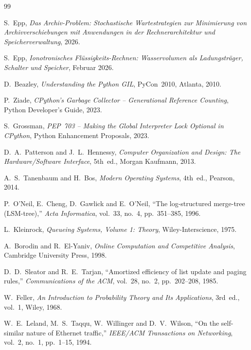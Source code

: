 ﻿\documentclass[a4paper,12pt]{scrreprt}
\theoremstyle{definition}
\begin{document}
	\begin{thebibliography}{99}
		
		
		S.~Epp,
		\textit{Das Archiv-Problem: Stochastische Wartestrategien zur Minimierung
			von Archivverschiebungen mit Anwendungen in der Rechnerarchitektur
			und Speicherverwaltung}, 2026.
		
		S.~Epp,
		\textit{Ionotronisches Flüssigkeits-Rechnen: Wasservolumen als
			Ladungsträger, Schalter und Speicher}, Februar 2026.
		
		D.~Beazley,
		\textit{Understanding the Python GIL},
		PyCon~2010, Atlanta, 2010.
		
		P.~Ziade,
		\textit{CPython's Garbage Collector -- Generational Reference Counting},
		Python Developer's Guide, 2023.
		
		S.~Grossman,
		\textit{PEP~703 -- Making the Global Interpreter Lock Optional in CPython},
		Python Enhancement Proposals, 2023.
		
		D.~A.~Patterson and J.~L.~Hennessy,
		\textit{Computer Organization and Design: The Hardware/Software Interface},
		5th~ed., Morgan Kaufmann, 2013.
		
		A.~S.~Tanenbaum and H.~Bos,
		\textit{Modern Operating Systems}, 4th~ed., Pearson, 2014.
		
		P.~O'Neil, E.~Cheng, D.~Gawlick and E.~O'Neil,
		``The log-structured merge-tree (LSM-tree),''
		\textit{Acta Informatica}, vol.~33, no.~4, pp.~351--385, 1996.
		
		L.~Kleinrock,
		\textit{Queueing Systems, Volume 1: Theory},
		Wiley-Interscience, 1975.
		
		A.~Borodin and R.~El-Yaniv,
		\textit{Online Computation and Competitive Analysis},
		Cambridge University Press, 1998.
		
		D.~D.~Sleator and R.~E.~Tarjan,
		``Amortized efficiency of list update and paging rules,''
		\textit{Communications of the ACM}, vol.~28, no.~2, pp.~202--208, 1985.
		
		W.~Feller,
		\textit{An Introduction to Probability Theory and Its Applications},
		3rd~ed., vol.~1, Wiley, 1968.
		
		W.~E.~Leland, M.~S.~Taqqu, W.~Willinger and D.~V.~Wilson,
		``On the self-similar nature of Ethernet traffic,''
		\textit{IEEE/ACM Transactions on Networking}, vol.~2, no.~1, pp.~1--15, 1994.
		

\end{thebibliography}
\end{document}
